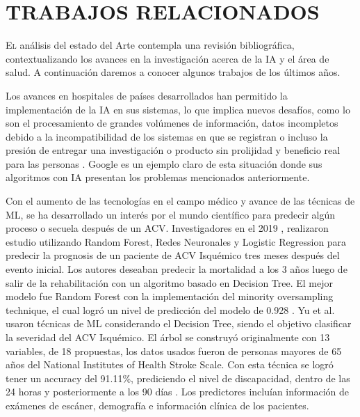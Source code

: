 \doublespacing
\chapter{TRABAJOS RELACIONADOS}
\label{sec:trabajos relacionados}
\lettrine[lines=4, slope=0.2em, findent=0.2em, nindent=0.6em]{E}{l}  análisis del estado del Arte contempla una revisión bibliográfica, contextualizando los avances en la investigación acerca de la IA y el área de salud. A continuación daremos a conocer algunos trabajos de los últimos años.\\

\par Los avances en hospitales de países desarrollados han permitido la implementación de la IA en sus sistemas, lo que implica nuevos desafíos, como lo son el procesamiento de grandes volúmenes de información,  datos incompletos debido a la incompatibilidad de los sistemas en que se registran o incluso la presión de entregar una investigación o producto sin prolijidad y beneficio real para las personas \cite{Nagendran2020}. Google es un ejemplo claro de esta situación donde  sus algoritmos con IA presentan los problemas mencionados anteriormente.\\

\par Con el aumento de las tecnologías en el campo médico y avance de las técnicas de ML, se ha desarrollado un interés por el mundo científico para predecir algún proceso o secuela después de un ACV. Investigadores en el 2019 \cite{Heo2019}, realizaron estudio utilizando Random Forest, Redes Neuronales y Logistic Regression para predecir la prognosis de un paciente de ACV Isquémico tres meses después del evento inicial. Los autores deseaban predecir la mortalidad a los 3 años luego de salir de la rehabilitación con un algoritmo basado en Decision Tree. El mejor modelo fue Random Forest con la implementación del minority oversampling technique, el cual logró un nivel de predicción del modelo de 0.928  \cite{Scrutinio2020}. Yu et al. \cite{Yu2020} usaron técnicas de ML considerando el Decision Tree, siendo el objetivo clasificar la severidad del ACV Isquémico. El árbol se construyó originalmente con 13 variables, de 18 propuestas, los datos usados fueron de personas mayores de 65 años del National Institutes of Health Stroke Scale. Con esta técnica se logró tener un accuracy del 91.11\%, prediciendo el nivel de discapacidad, dentro de las 24 horas  y posteriormente a los 90 días  \cite{Xie2018}. Los predictores incluían información de exámenes de escáner, demografía e información clínica de los pacientes.\\

